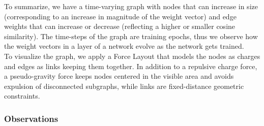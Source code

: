 To summarize, we have a time-varying graph with nodes that can increase in size (corresponding to an increase in magnitude of the weight vector) and edge weights that can increase or decrease (reflecting a higher or smaller cosine similarity). The time-steps of the graph are training epochs, thus we observe how the weight vectors in a layer of a network evolve as the network gets trained. \\

To visualize the graph, we apply a Force Layout that models the nodes as charges and edges as links keeping them together. In addition to a repulsive charge force, a pseudo-gravity force keeps nodes centered in the visible area and avoids expulsion of disconnected subgraphs, while links are fixed-distance geometric constraints.


\subsubsection*{Observations}

